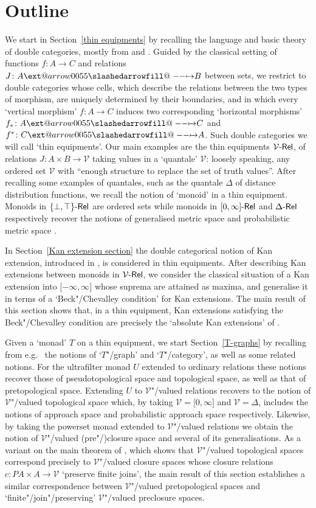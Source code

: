 \documentclass[preprint, a4paper]{elsarticle}
\makeatletter
\def\slashedarrowfill@#1#2#3#4#5{%
  $\m@th\thickmuskip0mu\medmuskip\thickmuskip\thinmuskip\thickmuskip
   \relax#5#1\mkern-7mu%
   \cleaders\hbox{$#5\mkern-2mu#2\mkern-2mu$}\hfill
   \mathclap{#3}\mathclap{#2}%
   \cleaders\hbox{$#5\mkern-2mu#2\mkern-2mu$}\hfill
   \mkern-7mu#4$%
}
\def\rightslashedarrowfill@{%
  \slashedarrowfill@\relbar\relbar\mapstochar\rightarrow}
\newcommand\xslashedrightarrow[2][]{%
  \ext@arrow 0055{\rightslashedarrowfill@}{#1}{#2}}
\def\slashedrightarrow{\xslashedrightarrow{}}
\theoremstyle{definition}
\theoremstyle{remark}
\providecommand{\secref}[1]{Section~\ref{#1}}
\providecommand{\brcs}[1]{\lbrace #1 \rbrace}
\providecommand{\brks}[1]{\lbrack #1 \rbrack}
\providecommand{\set}[1]{\brcs{#1}}
\providecommand{\map}[3]{#1\colon#2\to#3}
\providecommand{\hmap}[3]{#1\colon#2\slashedrightarrow#3}
\providecommand{\catvar}[1]{\mathcal{#1}}
\providecommand{\2}{\mathsf 2}
\providecommand{\V}{\catvar V}
\providecommand{\Rel}{\mathsf{Rel}}
\providecommand{\enRel}[1]{#1\text-\Rel}
\makeatother
\begin{document}
	\section*{Outline}
	We start in \secref{thin equipments} by recalling the language and basic theory of double categories, mostly from \cite{Grandis-Pare99} and \cite{Grandis-Pare04}. Guided by the classical setting of functions $\map fAC$ and relations $\hmap JAB$ between sets, we restrict to double categories whose cells, which describe the relations between the two types of morphism, are uniquely determined by their boundaries, and in which every `vertical morphism' $\map fAC$ induces two corresponding `horizontal morphisms' $\hmap{f_*}AC$ and $\hmap{f^*}CA$. Such double categories we will call `thin equipments'. Our main examples are the thin equipments $\enRel\V$, of relations \mbox{$\map J{A \times B}\V$} taking values in a `quantale' $\V$: loosely speaking, any ordered set $\V$ with ``enough structure to replace the set of truth values''. After recalling some examples of quantales, such as the quantale $\Delta$ of distance distribution functions, we recall the notion of `monoid' in a thin equipment. Monoids in $\enRel{\set{\bot, \top}}$ are ordered sets while monoids in $\enRel{\brks{0, \infty}}$ and $\enRel\Delta$ respectively recover the notions of generalised metric space \cite{Lawvere73} and probabilistic metric space \cite{Menger42}.
	
	In \secref{Kan extension section} the double categorical notion of Kan extension, introduced in \cite{Koudenburg14}, is considered in thin equipments. After describing Kan extensions between monoids in $\enRel\V$, we consider the classical situation of a Kan extension into $\brks{-\infty, \infty}$ whose suprema are attained as maxima, and generalise it in terms of a `Beck"/Chevalley condition' for Kan extensions. The main result of this section shows that, in a thin equipment, Kan extensions satisfying the Beck"/Chevalley condition are precisely the `absolute Kan extensions' of \cite{Grandis-Pare08}.
	
	Given a `monad' $T$ on a thin equipment, we start \secref{T-graphs} by recalling from e.g.\ \cite{Hofmann-Seal-Tholen14} the notions of `$T$"/graph' and `$T$"/category', as well as some related notions. For the ultrafilter monad $U$ extended to ordinary relations these notions recover those of pseudotopological space and topological space, as well as that of pretopological space. Extending $U$ to $\V$"/valued relations recovers to the notion of $\V$"/valued topological space \cite{Lai-Tholen17b} which, by taking $\V = \brks{0, \infty}$ and $\V = \Delta$, includes the notions of approach space and probabilistic approach space respectively. Likewise, by taking the powerset monad extended to $\V$"/valued relations we obtain the notion of $\V$"/valued (pre"/)closure space and several of its generalisations. As a variant on the main theorem of \cite{Lai-Tholen17a}, which shows that $\V$"/valued topological spaces correspond precisely to $\V$"/valued closure spaces whose closure relations $\map c{PA \times A}\V$ `preserve finite joins', the main result of this section establishes a similar correspondence between $\V$"/valued pretopological spaces and `finite"/join"/preserving' $\V$"/valued preclosure spaces.
	
\end{document}
